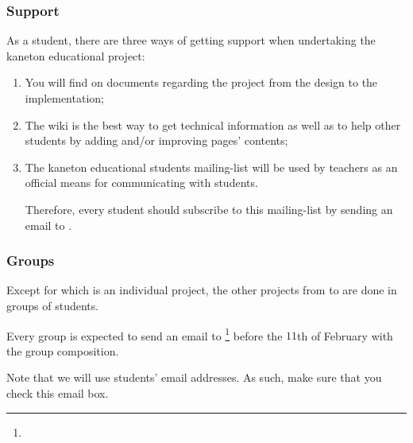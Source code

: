 \begin{frame}
  \frametitle{Support}

  As a student, there are three ways of getting support when undertaking
  the kaneton educational project:

  \-

  \begin{enumerate}
    \item

      \-

      You will find on  documents regarding
      the project from the design to the implementation;
    \item

      \-

      The wiki  is the best way to get
      technical information as well as to help other students by adding
      and/or improving pages' contents;
    \item

      \-

      The kaneton educational students mailing-list
       will be used by teachers as
      an official means for communicating with students.

      \-

      Therefore, every student should subscribe to this mailing-list by sending
      an email to .
  \end{enumerate}
\end{frame}


\begin{frame}
  \frametitle{Groups}

  Except for  which is an individual project, the other projects
  from  to  are done in groups of  students.

  \-

  Every group is expected to send an email to
  \footnote{}
  before the $11$th of February with the group composition.

  \-

  Note that we will use students'  email addresses. As such,
  make sure that you check this email box.
\end{frame}

